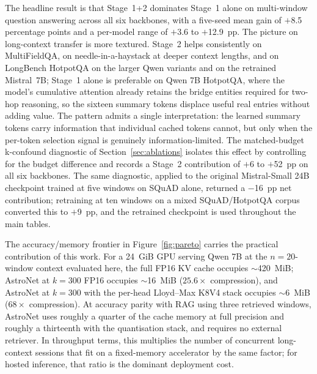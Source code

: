 \documentclass[sn-nature,Numbered]{sn-jnl}
\begin{document}
The headline result is that Stage~1+2 dominates Stage~1 alone on multi-window question answering across all six backbones, with a five-seed mean gain of $+$8.5 percentage points and a per-model range of $+$3.6 to $+$12.9~pp. The picture on long-context transfer is more textured. Stage~2 helps consistently on MultiFieldQA, on needle-in-a-haystack at deeper context lengths, and on LongBench HotpotQA on the larger Qwen variants and on the retrained Mistral~7B; Stage~1 alone is preferable on Qwen 7B HotpotQA, where the model's cumulative attention already retains the bridge entities required for two-hop reasoning, so the sixteen summary tokens displace useful real entries without adding value. The pattern admits a single interpretation: the learned summary tokens carry information that individual cached tokens cannot, but only when the per-token selection signal is genuinely information-limited. The matched-budget k-confound diagnostic of Section~\ref{sec:ablations} isolates this effect by controlling for the budget difference and records a Stage~2 contribution of $+$6 to $+$52~pp on all six backbones. The same diagnostic, applied to the original Mistral-Small 24B checkpoint trained at five windows on SQuAD alone, returned a $-$16~pp net contribution; retraining at ten windows on a mixed SQuAD/HotpotQA corpus converted this to $+$9~pp, and the retrained checkpoint is used throughout the main tables.

The accuracy/memory frontier in Figure~\ref{fig:pareto} carries the practical contribution of this work. For a 24~GiB GPU serving Qwen 7B at the $n{=}20$-window context evaluated here, the full FP16 KV cache occupies $\sim$420~MiB; AstroNet at $k{=}300$ FP16 occupies $\sim$16~MiB ($25.6\times$ compression), and AstroNet at $k{=}300$ with the per-head Lloyd--Max K8V4 stack occupies $\sim$6~MiB ($68\times$ compression). At accuracy parity with RAG using three retrieved windows, AstroNet uses roughly a quarter of the cache memory at full precision and roughly a thirteenth with the quantisation stack, and requires no external retriever. In throughput terms, this multiplies the number of concurrent long-context sessions that fit on a fixed-memory accelerator by the same factor; for hosted inference, that ratio is the dominant deployment cost.
\end{document}
